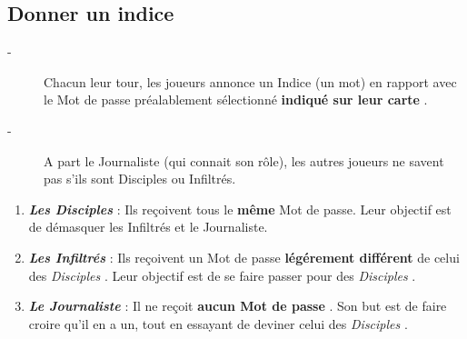 \documentclass{article}%
\begin{document}
%
\subsection{ Donner un indice
}%
\label{subsec:Donnerunindice}%
\begin{description}%
\item[{-} ]%
%
 Chacun leur tour, les joueurs annonce un Indice (un mot) en rapport avec le Mot de passe préalablement sélectionné %
\textbf{indiqué sur leur carte}%
.
%
\item[{-} ]%
%
 A part le Journaliste (qui connait son rôle), les autres joueurs ne savent pas s'ils sont Disciples ou Infiltrés.
%
\end{description}%
\begin{enumerate}%
\item%
%
\textbf{\textit{Les Disciples}}%
\textit{ }%
 : Ils reçoivent tous le %
\textbf{même}%
\textit{ }%
 Mot de passe. Leur objectif est de démasquer les Infiltrés et le Journaliste.
%
\item%
%
\textbf{\textit{Les Infiltrés}}%
\textit{ }%
 : Ils reçoivent un Mot de passe %
\textbf{légérement différent}%
\textit{ }%
 de celui des %
\textit{Disciples}%
. Leur objectif est de se faire passer pour des %
\textit{Disciples}%
.
%
\item%
%
\textbf{\textit{Le Journaliste}}%
\textit{ }%
 : Il ne reçoit %
\textbf{aucun Mot de passe}%
. Son but est de faire croire qu'il en a un, tout en essayant de deviner celui des %
\textit{Disciples}%
.
%
\end{enumerate}

%
\end{document}
